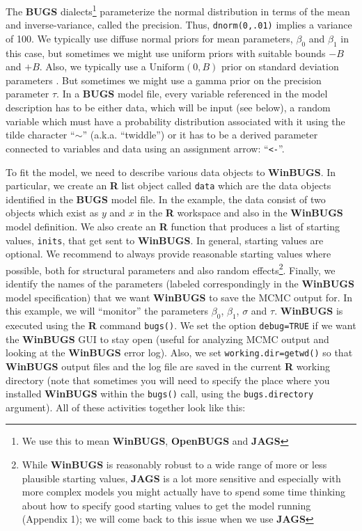 The {\bf BUGS} dialects\footnote{We use this to mean {\bf WinBUGS},
  {\bf OpenBUGS} and {\bf JAGS}} parameterize the normal distribution
in terms of the mean and inverse-variance, called the precision. Thus,
\mbox{\tt dnorm(0,.01)} implies a variance of 100.  We typically use
diffuse normal priors for mean parameters, $\beta_0$ and $\beta_1$ in
this case, but sometimes we might use uniform priors with suitable
bounds $-B$ and $+B$.  Also, we typically use a $\text{Uniform}(0,B)$
prior on standard deviation parameters \citep{gelman:2006}.  But
sometimes we might use a gamma prior on the precision parameter
$\tau$.  In a {\bf BUGS} model file, every variable referenced in the
model description has to be either data, which will be input (see
below), a random variable which must have a probability distribution
associated with it using the tilde character ``$\sim$'' (a.k.a. ``twiddle'')
or it has to be a derived parameter connected to variables
and data using an assignment arrow: ``\mbox{\tt <-}''.


To fit the model, we need to describe various data objects to {\bf
  WinBUGS}. In particular,
we create an {\bf R} list object called \mbox{\tt data} which
are the data objects identified in the {\bf BUGS} model file.
 In the example, the
data consist of two objects which exist as $y$ and $x$ in the {\bf R}
workspace and also in the {\bf WinBUGS} model definition.
 We also create an {\bf R} function
that produces a list of starting values, \mbox{\tt inits}, that get sent to
{\bf WinBUGS}. In general, starting
values are optional. We recommend to always provide reasonable
starting values where possible, both for structural parameters and
also random effects\footnote{While {\bf WinBUGS} is reasonably robust to a
  wide range of more or less plausible starting values, {\bf JAGS} is
  a lot more sensitive and especially with more complex models you
  might actually have to spend some time thinking about how to specify
  good starting values to get the model running (Appendix 1); we
  will come back to this issue when we use {\bf JAGS}}. 
 Finally, we identify
the names of the parameters (labeled correspondingly in the {\bf WinBUGS}
model specification) that we want {\bf WinBUGS} to save the MCMC output
for. In this example, we will ``monitor'' the parameters
$\beta_0$, $\beta_1$, $\sigma$ and $\tau$.
{\bf WinBUGS} is executed using the {\bf R} command
\mbox{\tt bugs()}.
We set the option \mbox{\tt debug=TRUE} if we want the {\bf WinBUGS}
GUI to stay open (useful for analyzing MCMC output and looking at the
{\bf WinBUGS} error log). Also, we set \mbox{\tt working.dir=getwd()}
so that {\bf WinBUGS} output files and the log file are saved in the
current {\bf R} working directory (note that sometimes you will need to specify the place where you installed {\bf WinBUGS} within the \mbox{\tt bugs()} call, using the \mbox{\tt bugs.directory} argument).
  All of these activities together look like this:
  
